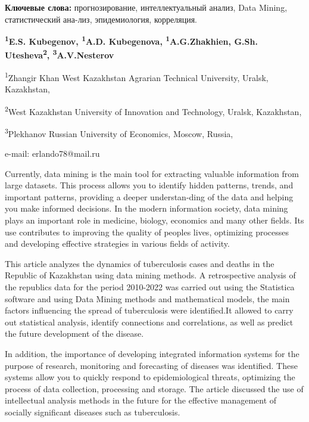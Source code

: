 {\bfseries Ключевые слова:} прогнозирование, интеллектуальный анализ, Data
Mining, статистический ана-лиз, эпидемиология, корреляция.


\begin{center}
{\bfseries \textsuperscript{1}E.S. Kubegenov\envelope,
\textsuperscript{1}A.D. Kubegenova, \textsuperscript{1}A.G.Zhakhien,
G.Sh. Utesheva\textsuperscript{2}, \textsuperscript{3}A.V.Nesterov}

\textsuperscript{1}Zhangir Khan West Kazakhstan Agrarian Technical
University, Uralsk, Kazakhstan,

\textsuperscript{2}West Kazakhstan University of Innovation and
Technology, Uralsk, Kazakhstan,

\textsuperscript{3}Plekhanov Russian University of Economics, Moscow,
Russia,

e-mail: erlando78@mail.ru
\end{center}

Currently, data mining is the main tool for extracting valuable
information from large datasets. This process allows you to identify
hidden patterns, trends, and important patterns, providing a deeper
understan-ding of the data and helping you make informed decisions. In
the modern information society, data mining plays an important role in
medicine, biology, economics and many other fields. Its use contributes
to improving the quality of people\textquotesingle s lives, optimizing
processes and developing effective strategies in various fields of
activity.

This article analyzes the dynamics of tuberculosis cases and deaths in
the Republic of Kazakhstan using data mining methods. A retrospective
analysis of the republic\textquotesingle s data for the period 2010-2022
was carried out using the Statistica software and using Data Mining
methods and mathematical models, the main factors influencing the spread
of tuberculosis were identified.It allowed to carry out statistical
analysis, identify connections and correlations, as well as predict the
future development of the disease.

In addition, the importance of developing integrated information systems
for the purpose of research, monitoring and forecasting of diseases was
identified. These systems allow you to quickly respond to
epidemiological threats, optimizing the process of data collection,
processing and storage. The article discussed the use of intellectual
analysis methods in the future for the effective management of socially
significant diseases such as tuberculosis.

